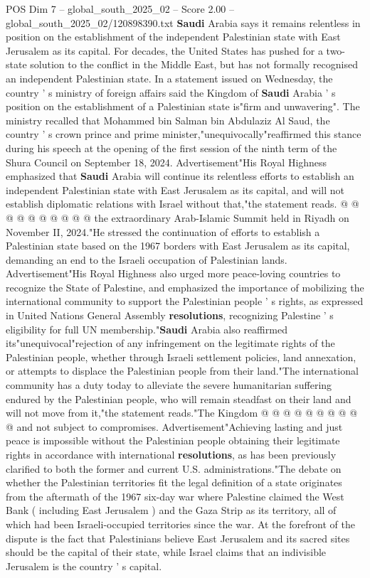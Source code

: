 \begin{textsample}{POS Dim 7 – global\_south\_2025\_02 – Score 2.00 – global\_south\_2025\_02/120898390.txt}  \label{ex:f7_pos_183}
\textbf{Saudi} Arabia says it remains relentless in position on the establishment of the independent Palestinian state with East Jerusalem as its capital.
For decades, the United States has pushed for a two-state solution to the conflict in the Middle East, but has not formally recognised an independent Palestinian state.
In a statement issued on Wednesday, the country ' s ministry of foreign affairs said the Kingdom of \textbf{Saudi} Arabia ' s position on the establishment of a Palestinian state is"firm and unwavering".
The ministry recalled that Mohammed bin Salman bin Abdulaziz Al Saud, the country ' s crown prince and prime minister,"unequivocally"reaffirmed this stance during his speech at the opening of the first session of the ninth term of the Shura Council on September 18, 2024.
Advertisement"His Royal Highness emphasized that \textbf{Saudi} Arabia will continue its relentless efforts to establish an independent Palestinian state with East Jerusalem as its capital, and will not establish diplomatic relations with Israel without that,"the statement reads. @ @ @ @ @ @ @ @ @ @ the extraordinary Arab-Islamic Summit held in Riyadh on November II, 2024."He stressed the continuation of efforts to establish a Palestinian state based on the 1967 borders with East Jerusalem as its capital, demanding an end to the Israeli occupation of Palestinian lands.
Advertisement"His Royal Highness also urged more peace-loving countries to recognize the State of Palestine, and emphasized the importance of mobilizing the international community to support the Palestinian people ' s rights, as expressed in United Nations General Assembly \textbf{resolutions}, recognizing Palestine ' s eligibility for full UN membership."\textbf{Saudi} Arabia also reaffirmed its"unequivocal"rejection of any infringement on the legitimate rights of the Palestinian people, whether through Israeli settlement policies, land annexation, or attempts to displace the Palestinian people from their land."The international community has a duty today to alleviate the severe humanitarian suffering endured by the Palestinian people, who will remain steadfast on their land and will not move from it,"the statement reads."The Kingdom @ @ @ @ @ @ @ @ @ @ and not subject to compromises.
Advertisement"Achieving lasting and just peace is impossible without the Palestinian people obtaining their legitimate rights in accordance with international \textbf{resolutions}, as has been previously clarified to both the former and current U.S. administrations."The debate on whether the Palestinian territories fit the legal definition of a state originates from the aftermath of the 1967 six-day war where Palestine claimed the West Bank ( including East Jerusalem ) and the Gaza Strip as its territory, all of which had been Israeli-occupied territories since the war.
At the forefront of the dispute is the fact that Palestinians believe East Jerusalem and its sacred sites should be the capital of their state, while Israel claims that an indivisible Jerusalem is the country ' s capital.

\end{textsample}
